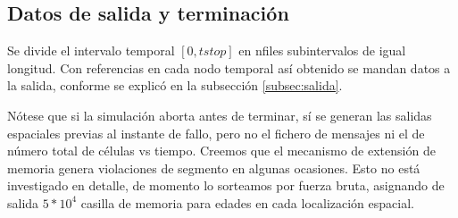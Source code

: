 \documentclass[12pt]{article}
\numberwithin{equation}{section}
\begin{document}
\subsection{Datos de salida y terminaci\'on}
Se divide el intervalo temporal $[0, tstop]$ en nfiles subintervalos de igual longitud. Con referencias en  cada nodo temporal as\'i obtenido se mandan datos a la salida, conforme se explic\'o en la subsecci\'on \ref{subsec:salida}. 

N\'otese que si la simulaci\'on aborta antes de terminar, s\'i se generan las salidas espaciales previas al instante de fallo, pero no el fichero de mensajes ni el de n\'umero total de c\'elulas vs tiempo. Creemos que el mecanismo de extensi\'on de memoria genera violaciones de segmento en algunas ocasiones. Esto no est\'a investigado en detalle, de momento lo sorteamos por fuerza bruta, asignando de salida $5*10^4$ casilla de memoria para edades en cada localizaci\'on espacial.





%
%
%
%
%
\end{document}
